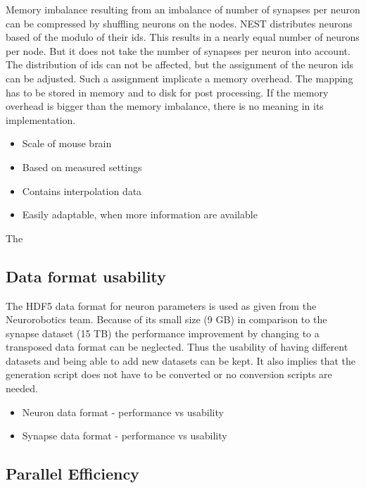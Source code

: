 \documentclass[a4paper]{article}
\begin{document}
Memory imbalance resulting from an imbalance of number of synapses per neuron can be compressed by shuffling neurons on the nodes.
NEST distributes neurons based of the modulo of their ids. This results in a nearly equal number of neurons per node.
But it does not take the number of synapses per neuron into account. The distribution of ids can not be affected, but the assignment of the
neuron ids can be adjusted. Such a assignment implicate a memory overhead. The mapping has to be stored in memory and to disk for post processing.
If the memory overhead is bigger than the memory imbalance, there is no meaning in its implementation.

\begin{itemize}
      \item Scale of mouse brain
      \item Based on measured settings
      \item Contains interpolation data
      \item Easily adaptable, when more information are available
\end{itemize}

The 


\subsection{Data format usability}

The HDF5 data format for neuron parameters is used as given from the Neurorobotics team.
Because of its small size (9 GB) in comparison to the synapse dataset (15 TB) the performance improvement by changing
to a transposed data format can be neglected. Thus the usability of having different datasets and being able
to add new datasets can be kept. It also implies that the generation script does not have to be converted or no 
conversion scripts are needed.

\begin{itemize}
	  \item Neuron data format - performance vs usability
      \item Synapse data format - performance vs usability
\end{itemize}

\subsection{Parallel Efficiency}
\end{document}
